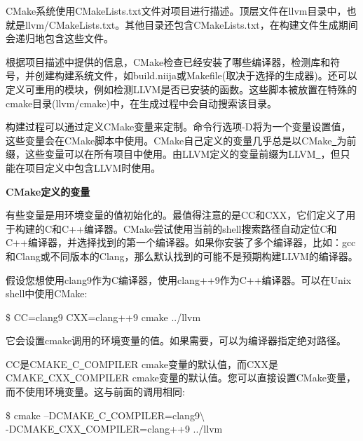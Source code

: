 CMake系统使用CMakeLists.txt文件对项目进行描述。顶层文件在llvm目录中，也就是llvm/CMakeLists.txt。其他目录还包含CMakeLists.txt，在构建文件生成期间会递归地包含这些文件。\par

根据项目描述中提供的信息，CMake检查已经安装了哪些编译器，检测库和符号，并创建构建系统文件，如build.niija或Makefile(取决于选择的生成器)。还可以定义可重用的模块，例如检测LLVM是否已安装的函数。这些脚本被放置在特殊的cmake目录(llvm/cmake)中，在生成过程中会自动搜索该目录。\par

构建过程可以通过定义CMake变量来定制。命令行选项-D将为一个变量设置值，这些变量会在CMake脚本中使用。CMake自己定义的变量几乎总是以CMake\underline{~}为前缀，这些变量可以在所有项目中使用。由LLVM定义的变量前缀为LLVM\underline{~}，但只能在项目定义中包含LLVM时使用。\par

\hspace*{\fill} \par %
\textbf{CMake定义的变量}

有些变量是用环境变量的值初始化的。最值得注意的是CC和CXX，它们定义了用于构建的C和C++编译器。CMake尝试使用当前的shell搜索路径自动定位C和C++编译器，并选择找到的第一个编译器。如果你安装了多个编译器，比如：gcc和Clang或不同版本的Clang，那么默认找到的可能不是预期构建LLVM的编译器。\par

假设您想使用clang9作为C编译器，使用clang++9作为C++编译器。可以在Unix shell中使用CMake:\par

\begin{tcolorbox}[colback=white,colframe=black]
\$ CC=clang9 CXX=clang++9 cmake ../llvm
\end{tcolorbox}

它会设置cmake调用的环境变量的值。如果需要，可以为编译器指定绝对路径。\par

CC是CMAKE\underline{~}C\underline{~}COMPILER cmake变量的默认值，而CXX是CMAKE\underline{~}CXX\underline{~}COMPILER cmake变量的默认值。您可以直接设置CMake变量，而不使用环境变量。这与前面的调用相同:\par

\begin{tcolorbox}[colback=white,colframe=black]
\$ cmake –DCMAKE\underline{~}C\underline{~}COMPILER=clang9$\setminus$\\
\hspace*{1cm}-DCMAKE\underline{~}CXX\underline{~}COMPILER=clang++9 ../llvm
\end{tcolorbox}

